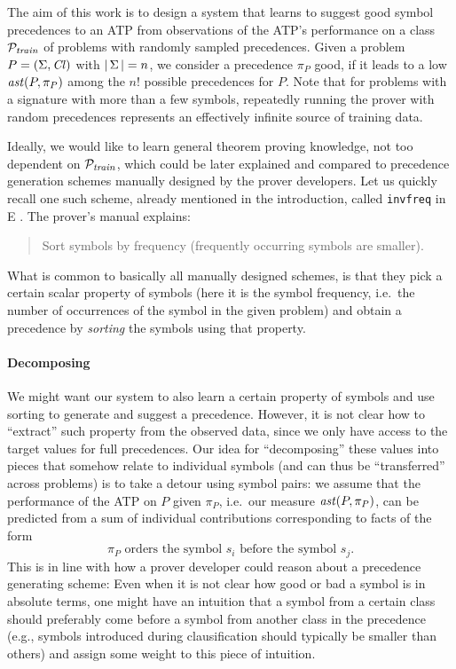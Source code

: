 \documentclass[a4paper]{easychair}
\begin{document}
The aim of this work is to design a system that learns to suggest good symbol precedences to an ATP 
from observations of the ATP's performance on a class \(\mathcal{P}_{\mathit{train}}\) of problems with randomly sampled precedences. 
Given a problem \(P = (\operatorname{\Sigma},\operatorname{\mathit{Cl}})\) with \(|\operatorname{\Sigma}|=n\), we consider a precedence \(\pi_P\) good,
if it leads to a low \(\operatorname{\mathit{ast}}(P,\pi_P)\)
among the $n!$ possible precedences for \(P\).
Note that for problems with a signature with more than a few symbols, repeatedly running the prover 
with random precedences represents an effectively infinite source of training data.

Ideally, we would like to learn general theorem proving knowledge, not too dependent on $\mathcal{P}_{\mathit{train}}$,
which could be later explained and compared to precedence generation schemes manually designed 
by the prover developers. Let us quickly recall one such scheme, already mentioned in the introduction,
called \texttt{invfreq} in E \cite{SCV:CADE-2019}. The prover's manual \cite{E-manual} explains:
\begin{quote}
Sort symbols by frequency (frequently occurring symbols are smaller).
\end{quote}
What is common to basically all manually designed schemes, is that they pick a certain scalar property of symbols 
(here it is the symbol frequency, i.e.~the number of occurrences of the symbol in the given problem)
and obtain a precedence by \emph{sorting} the symbols using that property.

\paragraph{Decomposing}

We might want our system to also learn a certain property of symbols and use sorting to generate and suggest a precedence. 
However, it is not clear how to ``extract'' such property from the observed data, since we only have 
access to the target values for full precedences. Our idea for ``decomposing'' these values into pieces 
that somehow relate to individual symbols (and can thus be ``transferred'' across problems) is to take a detour using symbol pairs:
we assume that the performance of the ATP on \(P\) given \(\pi_P\), i.e.~our measure $\operatorname{\mathit{ast}}(P,\pi_P)$, can be predicted 
from a sum of individual contributions corresponding to facts of the form 
\[\pi_P\text{ orders the symbol }s_i\text{ before the symbol }s_j.\]
This is in line with how a prover developer could reason about a precedence generating scheme:
Even when it is not clear how good or bad a symbol is in absolute terms,
one might have an intuition that a symbol from a certain class should preferably 
come before a symbol from another class in the precedence  
(e.g., symbols introduced during clausification should typically be smaller than others)
and assign some weight to this piece of intuition. 
\end{document}
